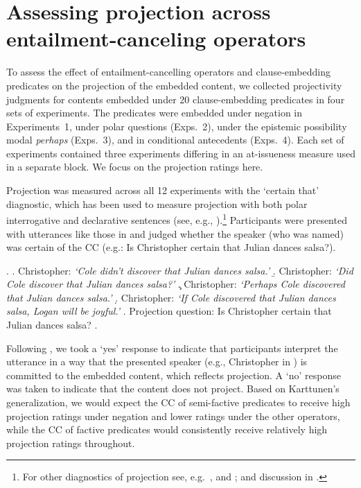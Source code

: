 \documentclass[a4paper,12pt,twoside]{article}
\begin{document}
\section{Assessing projection across entailment-canceling operators}

	To assess the effect of entailment-cancelling operators and clause-embedding predicates on the projection of the embedded content, we collected projectivity judgments for contents embedded under 20 clause-embedding predicates in four sets of experiments. The predicates were embedded under negation in Experiments~1, under polar questions (Exps.~2), under the epistemic possibility modal {\em perhaps} (Exps.~3), and in conditional antecedents (Exps.~4). Each set of experiments contained three experiments differing in an at-issueness measure used in a separate block. We focus on the projection ratings here.

		Projection was measured across all 12 experiments with the `certain that' diagnostic, which has been used to measure projection with both polar interrogative and declarative sentences (see, e.g., \citealt{tonhauser_prosodic_2016,djarv_prosodic_2017,stevens_rational_2017,lorson_influence_2018,tonhauser_how_2018,mahler_does_2019,mahler_social_2020,de_marneffe_commitmentbank_2019}).\footnote{For other diagnostics of projection see, e.g.\ \citealt{smith_projection_2011,xue_correlation_2011}, and \citealt{tonhauser_toward_2013}; and discussion in \citealt{tonhauser_how_2018}.} Participants were presented with utterances like those in \Next and judged whether the speaker (who was named) was certain of the CC (e.g.: Is Christopher certain that Julian dances salsa?).

		\ex. \label{ex:certain-that}
			\a. Christopher: \emph{\lq Cole didn't discover that Julian dances salsa.\rq}
			\b. Christopher: \emph{\lq Did Cole discover that Julian dances salsa?\rq}
			\c. Christopher: \emph{\lq Perhaps Cole discovered that Julian dances salsa.\rq}
			\d. Christopher: \emph{\lq If Cole discovered that Julian dances salsa, Logan will be joyful.\rq}
			\z.
			Projection question: Is Christopher certain that Julian dances salsa?
		\z.

		Following \citet{tonhauser_prosodic_2016,djarv_prosodic_2017,tonhauser_how_2018,lorson_influence_2018,mahler_does_2019}, we took a `yes' response to indicate that participants interpret the utterance in a way that the presented speaker (e.g., Christopher in \Last) is committed to the embedded content, which reflects projection. A `no' response was taken to indicate that the content does not project.
		Based on Karttunen's generalization, we would expect the CC of semi-factive predicates to receive high projection ratings under negation and lower ratings under the other operators, while the CC of factive predicates would consistently receive relatively high projection ratings throughout.
\end{document}
